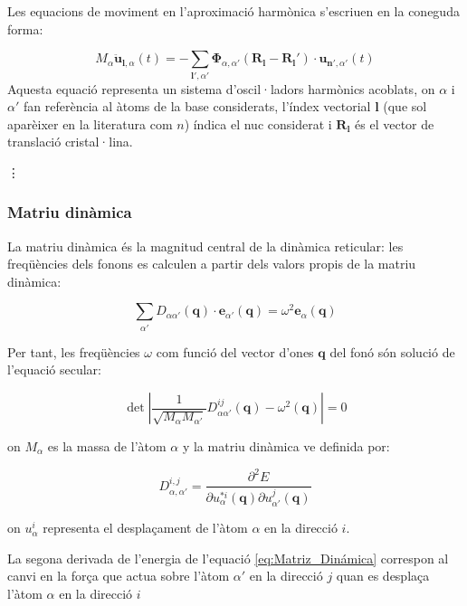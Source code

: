\documentclass[12pt]{article} %
\let\vec\mathbf %
\begin{document}
Les equacions de moviment en l'aproximació harmònica s'escriuen en la coneguda forma:

\begin{equation}
 M_\alpha\vec{\ddot{u}}_{\vec l,\alpha}(t)=-\sum_{\vec l',\alpha'}\vec\Phi_{\alpha,\alpha'}\left(\vec R_\vec l-\vec R_\vec l'\right)\cdot\vec u_{\vec n',\alpha'}(t)
\end{equation}
 Aquesta equació representa un sistema  d'oscil·ladors harmònics acoblats, on $\alpha$ i $\alpha'$ fan referència al àtoms de la base considerats, l'índex vectorial $\vec l$ (que sol aparèixer en la literatura com $n$) índica el nuc considerat i $\vec R_\vec l$ és el vector de translació cristal·lina.
 
\vdots 




\subsubsection{Matriu dinàmica}

La matriu dinàmica és la magnitud central de la dinàmica reticular: les freqüències dels fonons es calculen a partir dels valors propis de la matriu dinàmica:

\begin{equation}
\sum_{\alpha\prime}D_{\alpha\alpha\prime}(\vec q)\cdot\vec e_{\alpha\prime}(\vec q)=\omega^{2}\vec e_{\alpha}(\vec q)
\end{equation}   

Per tant, les freqüències $\omega$ com funció del vector d'ones $\vec q$ del fonó són solució de l'equació secular:

\begin{equation}
\det\left|\frac{1}{\sqrt{M_\alpha M_{\alpha\prime}}}D^{ij}_{\alpha\alpha\prime}\left(\vec q\right)-\omega^2\left(\vec q\right)\right|=0 
\end{equation}

on $M_{\alpha}$ es la massa de l'àtom $\alpha$ y la matriu dinàmica ve definida por:

\begin{equation}
D_{\alpha,\alpha\prime}^{i,j}=\frac{\partial^2 E}{\partial u_{\alpha}^{*i}(\vec q)\partial u_{\alpha\prime}^{j}(\vec q)}
\label{eq:Matriz_Dinámica}
\end{equation}

on $u_{\alpha}^{i}$ representa el despla\c{c}ament de l'àtom $\alpha$ en la direcció $i$.

La segona derivada de l'energia de l'equació \ref{eq:Matriz_Dinámica} correspon al canvi en la for\c{c}a que actua sobre l'àtom $\alpha\prime$ en la direcció $j$ quan es despla\c{c}a l'àtom $\alpha$ en la direcció $i$
\end{document}

